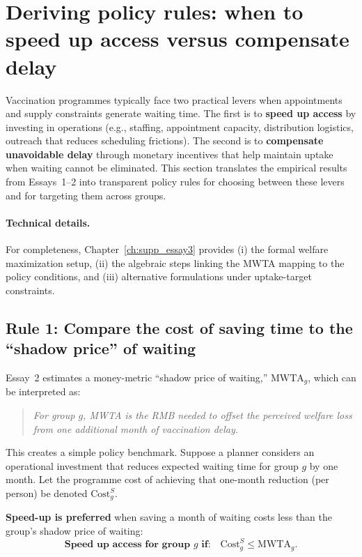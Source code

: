 \documentclass[doublespacing]{utdthesis}
\begin{document}
\clearpage

\section{Deriving policy rules: when to speed up access versus compensate delay}
\label{sec:essay3_rules}

Vaccination programmes typically face two practical levers when appointments and supply constraints generate waiting time. The first is to \textbf{speed up access} by investing in operations (e.g., staffing, appointment capacity, distribution logistics, outreach that reduces scheduling frictions). The second is to \textbf{compensate unavoidable delay} through monetary incentives that help maintain uptake when waiting cannot be eliminated. This section translates the empirical results from Essays~1--2 into transparent policy rules for choosing between these levers and for targeting them across groups.


\paragraph{Technical details.}
For completeness, Chapter~\ref{ch:supp_essay3} provides (i) the formal welfare maximization setup, (ii) the algebraic steps linking the MWTA mapping to the policy conditions, and (iii) alternative formulations under uptake-target constraints.


\subsection{Rule 1: Compare the cost of saving time to the ``shadow price'' of waiting}
\label{subsec:essay3_rule1}

Essay~2 estimates a money-metric ``shadow price of waiting,'' $\text{MWTA}_g$, which can be interpreted as:

\begin{quote}
\emph{For group $g$, MWTA is the RMB needed to offset the perceived welfare loss from one additional month of vaccination delay.}
\end{quote}

This creates a simple policy benchmark. Suppose a planner considers an operational investment that reduces expected waiting time for group $g$ by one month. Let the programme cost of achieving that one-month reduction (per person) be denoted $\text{Cost}^{S}_g$.

\textbf{Speed-up is preferred} when saving a month of waiting costs less than the group’s shadow price of waiting:
\begin{equation}
\textbf{Speed up access for group $g$ if:}\quad \text{Cost}^{S}_g \le \text{MWTA}_g.
\label{eq:policy_rule_speed}
\end{equation}
\end{document}
